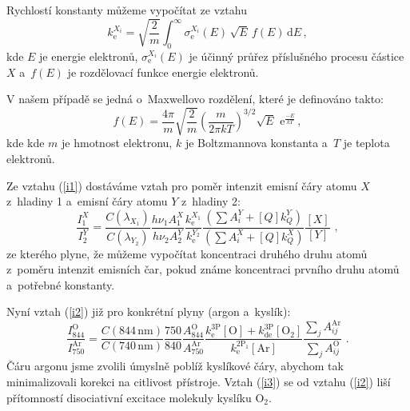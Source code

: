 \documentclass[12pt]{article}
\begin{document}
Rychlostí konstanty můžeme vypočítat ze vztahu
%
\begin{equation}
k_\mathrm{e}^{X_i} =  \sqrt{\frac{2}{m}} \int_0^\infty \sigma_\mathrm{e}^{X_i}(E)\,\sqrt{E}\,f(E)\,\mathrm{d}E \, \mathrm{,} \label{vzoreck}
\end{equation}
%
kde $E$ je energie elektronů, $\sigma_\mathrm{e}^{X_i}(E)$ je účinný průřez příslušného procesu částice $X$ a~$f(E)$ je rozdělovací funkce energie elektronů. 

V našem případě se jedná o~Maxwellovo rozdělení, které je definováno takto:
%
\begin{equation}
f(E) = \frac{4\pi}{m} \sqrt{\frac{2}{m}} \left( \frac{m}{2 \pi k T} \right)^{3/2} \sqrt{E} \,\,\mathrm{e}^{\frac{-E}{kT}} \, \mathrm{,} 
\end{equation}
%
kde kde $m$ je hmotnost elektronu, $k$ je Boltzmannova konstanta a~$T$ je teplota elektronů.

Ze vztahu (\ref{i1}) dostáváme vztah pro poměr intenzit emisní čáry atomu $X$ z~hladiny 1 a~emisní čáry atomu  $Y$ z~hladiny 2:
%
\begin{equation}
\frac{I_1^X}{I_2^Y} = 
\frac{C (\lambda_{X_1})}{C (\lambda_{Y_2}) }
\frac{h \nu_1 A_1^X } {h \nu_2 A_2^Y} 
\frac{k_\mathrm{e}^{X_1} }{k_\mathrm{e}^{Y_2} }  
\frac{ ( \sum{A_{i}^Y + [Q] k_Q^Y} ) }{ ( \sum{A_{i}^X + [Q] k_Q^X} ) }
\frac{[X]}{[Y]}
 \,\, \mathrm{,} \label{i2}
\end{equation}
%
ze kterého plyne, že můžeme vypočítat koncentraci druhého druhu atomů z~poměru intenzit emisních čar, pokud známe koncentraci prvního druhu atomů a~potřebné konstanty. 

Nyní vztah (\ref{i2}) již pro konkrétní plyny (argon a~kyslík):
%
\begin{equation}
\frac{I_{844}^\mathrm{O} } {I_{750}^\mathrm{Ar}} =
\frac{C (844\,\mathrm{nm})} {C (740\,\mathrm{nm}) }
\frac{750} {840} 
\frac{ A_{844}^\mathrm{O} } { A_{750}^\mathrm{Ar} }
\frac{ k_\mathrm{e}^\mathrm{3P} [\mathrm{O}] + k_\mathrm{de}^\mathrm{3P} [\mathrm{O}_2] } {k_\mathrm{e}^\mathrm{2P_1} [\mathrm{Ar}]}  
\frac{\sum_j{A_{ij}^\mathrm{Ar}}  } { \sum_j{A_{ij}^\mathrm{O}} }
\,\, \mathrm{.} \label{i3}
\end{equation}
%
Čáru argonu jsme zvolili úmyslně poblíž kyslíkové čáry, abychom tak minimalizovali korekci na citlivost přístroje. Vztah (\ref{i3}) se od vztahu (\ref{i2}) liší přítomností disociativní excitace molekuly kyslíku O$_2$.
\end{document}
